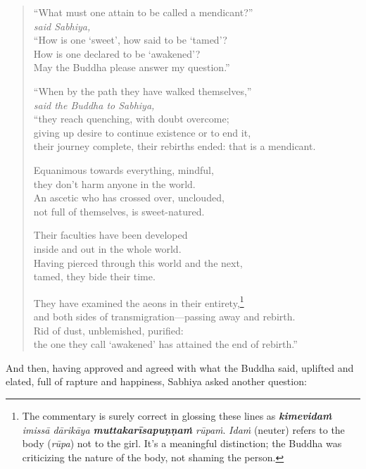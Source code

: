 \documentclass[12pt,openany]{book}%
\newcommand*{\scspeaker}[1]{\hspace{2em}\textit{#1}}
\begin{document}
\begin{verse}%
“What must one attain to be called a mendicant?” \\
\scspeaker{said Sabhiya, }\\
“How is one ‘sweet’, how said to be ‘tamed’? \\
How is one declared to be ‘awakened’? \\
May the Buddha please answer my question.” 

“When by the path they have walked themselves,” \\
\scspeaker{said the Buddha to Sabhiya, }\\
“they reach quenching, with doubt overcome; \\
giving up desire to continue existence or to end it, \\
their journey complete, their rebirths ended: that is a mendicant. 

Equanimous towards everything, mindful, \\
they don’t harm anyone in the world. \\
An ascetic who has crossed over, unclouded, \\
not full of themselves, is sweet-natured. 

Their faculties have been developed \\
inside and out in the whole world. \\
Having pierced through this world and the next, \\
tamed, they bide their time. 

They have examined the aeons in their entirety,\footnote{The commentary is surely correct in glossing these lines as \textit{\textbf{\textsanskrit{kimevidaṁ}} \textsanskrit{imissā} \textsanskrit{dārikāya} \textbf{\textsanskrit{muttakarīsapuṇṇaṁ}} \textsanskrit{rūpaṁ}}. \textit{\textsanskrit{Idaṁ}} (neuter) refers to the body (\textit{\textsanskrit{rūpa}}) not to the girl. It’s a meaningful distinction; the Buddha was criticizing the nature of the  body, not shaming the person. } \\
and both sides of transmigration—passing away and rebirth. \\
Rid of dust, unblemished, purified: \\
the one they call ‘awakened’ has attained the end of rebirth.” 

%
\end{verse}

And then, having approved and agreed with what the Buddha said, uplifted and elated, full of rapture and happiness, Sabhiya asked another question: 
\end{document}
